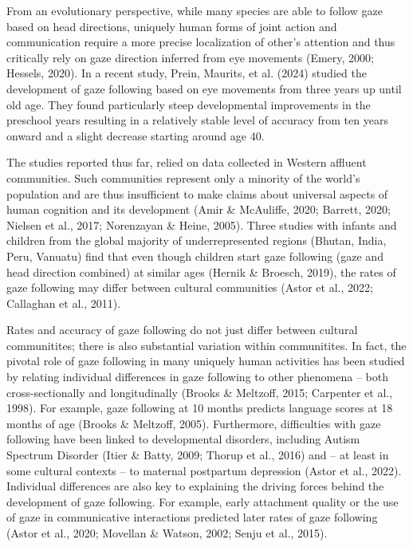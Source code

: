 \documentclass[
  man,floatsintext]{apa7}
\begin{document}
From an evolutionary perspective, while many species are able to follow gaze based on head directions, uniquely human forms of joint action and communication require a more precise localization of other's attention and thus critically rely on gaze direction inferred from eye movements (Emery, 2000; Hessels, 2020). In a recent study, Prein, Maurits, et al. (2024) studied the development of gaze following based on eye movements from three years up until old age. They found particularly steep developmental improvements in the preschool years resulting in a relatively stable level of accuracy from ten years onward and a slight decrease starting around age 40.

The studies reported thus far, relied on data collected in Western affluent communities. Such communities represent only a minority of the world's population and are thus insufficient to make claims about universal aspects of human cognition and its development (Amir \& McAuliffe, 2020; Barrett, 2020; Nielsen et al., 2017; Norenzayan \& Heine, 2005). Three studies with infants and children from the global majority of underrepresented regions (Bhutan, India, Peru, Vanuatu) find that even though children start gaze following (gaze and head direction combined) at similar ages (Hernik \& Broesch, 2019), the rates of gaze following may differ between cultural communities (Astor et al., 2022; Callaghan et al., 2011).

Rates and accuracy of gaze following do not just differ between cultural communitites; there is also substantial variation within communitites. In fact, the pivotal role of gaze following in many uniquely human activities has been studied by relating individual differences in gaze following to other phenomena -- both cross-sectionally and longitudinally (Brooks \& Meltzoff, 2015; Carpenter et al., 1998). For example, gaze following at 10 months predicts language scores at 18 months of age (Brooks \& Meltzoff, 2005). Furthermore, difficulties with gaze following have been linked to developmental disorders, including Autism Spectrum Disorder (Itier \& Batty, 2009; Thorup et al., 2016) and -- at least in some cultural contexts -- to maternal postpartum depression (Astor et al., 2022). Individual differences are also key to explaining the driving forces behind the development of gaze following. For example, early attachment quality or the use of gaze in communicative interactions predicted later rates of gaze following (Astor et al., 2020; Movellan \& Watson, 2002; Senju et al., 2015).
\end{document}
